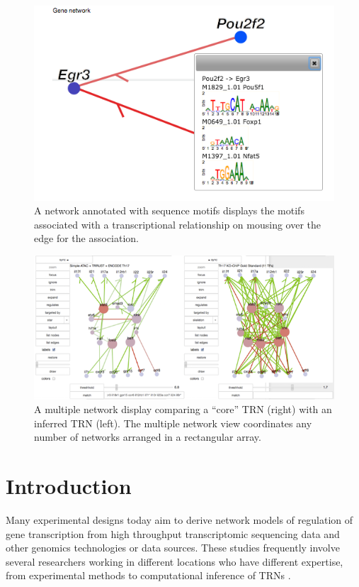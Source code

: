 \documentclass[10pt,letterpaper]{article}
\begin{document}
\begin{figure}[htb]
  \centering
  \includegraphics[width=.8\linewidth]{motif}
  \caption{\label{motif}
           A network annotated with sequence motifs displays the motifs associated with a transcriptional 
           relationship on mousing over the edge for the association.
  }
\end{figure}

\begin{figure}[htb]
  \centering
  \includegraphics[width=.8\linewidth]{pair}
  \caption{\label{pair}
           A multiple network display comparing a “core” TRN (right) with an inferred TRN (left).  
           The multiple network view coordinates any number of networks arranged in a rectangular array.
  }
\end{figure}



\section{Introduction}

Many experimental designs today aim to derive network models of regulation of 
gene transcription \cite{arrieta2015, Blatti2015, yosef2013, karwacz2017} from 
high throughput transcriptomic sequencing data \cite{reuter2015} and 
other genomics technologies or data sources.  
These studies frequently involve several researchers working in different locations 
who have different expertise, from experimental methods to computational 
inference of TRNs \cite{inferelator, wang2006}. 
\end{document}
